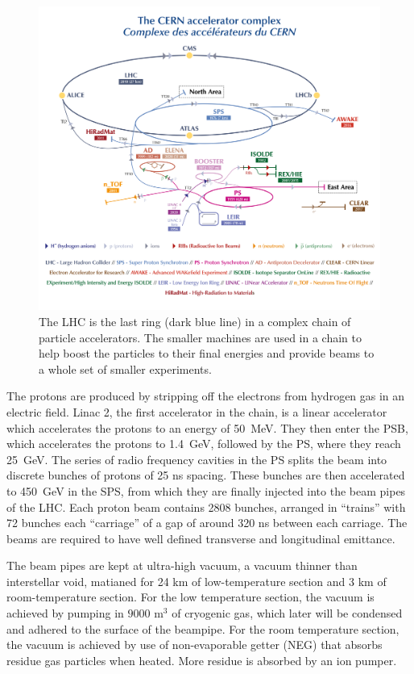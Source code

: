 \begin{figure}[bht]
	\begin{centering}	
	\includegraphics[width=.9\textwidth]{Detector/plots/accelerator_complex_smaller.png}
	\caption{The LHC is the last ring (dark blue line) in a complex chain of 
	particle accelerators. The smaller machines are used in a chain to help boost 
	the particles to their final energies and provide beams to a whole set of smaller experiments.
		}
	\label{fig:accelerator_complex}
	\end{centering}
\end{figure}

The protons are produced by stripping off the electrons from hydrogen gas
in an electric field. Linac 2, the first accelerator in the chain, 
is a linear accelerator which accelerates the protons to an energy of 50~MeV. 
They then enter the PSB, which accelerates the protons to 1.4~GeV, followed by 
the PS, where they reach 25~GeV. The series of radio frequency cavities in 
the PS splits the beam into discrete bunches of protons of 25 ns spacing. 
These bunches are then accelerated to 450~GeV in the SPS, from which they 
are finally injected into the beam pipes of the LHC. 
Each proton beam contains 2808 bunches, arranged in ``trains''
with 72 bunches each ``carriage'' of a gap of around 320 ns between each carriage. 
The beams are required to have well defined transverse and longitudinal emittance. 

The beam pipes are kept at ultra-high vacuum, a vacuum thinner than 
interstellar void, matianed for 24 km of low-temperature section and 3 km 
of room-temperature section. For the low temperature section, the vacuum is 
achieved by pumping in $9000$ m$^3$ of cryogenic gas, which later will be 
condensed and adhered to the surface of the beampipe. 
For the room temperature section, the vacuum 
is achieved by use of non-evaporable getter (NEG) that absorbs residue 
gas particles when heated. More residue is absorbed by an ion pumper. 

